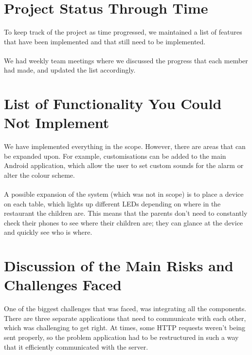 \documentclass{article}
\begin{document}
\section{Project Status Through Time}
\paragraph{}To keep track of the project as time progressed, we maintained a list of features that have been implemented and that still need to be implemented. 
\paragraph{}We had weekly team meetings where we discussed the progress that each member had made, and updated the list accordingly.

\section{List of Functionality You Could Not Implement}
\paragraph{}We have implemented everything in the scope. However, there are areas that can be expanded upon. For example, customisations can be added to the main Android application, which allow the user to set custom sounds for the alarm or alter the colour scheme.

\paragraph{}A possible expansion of the system (which was not in scope) is to place a device on each table, which lights up different LEDs depending on where in the restaurant the children are. This means that the parents don't need to constantly check their phones to see where their children are; they can glance at the device and quickly see who is where.


\section{Discussion of the Main Risks and Challenges Faced}
\paragraph{}One of the biggest challenges that was faced, was integrating all the components. There are three separate applications that need to communicate with each other, which was challenging to get right. At times, some HTTP requests weren't being sent properly, so the problem application had to be restructured in such a way that it efficiently communicated with the server.
\end{document}
